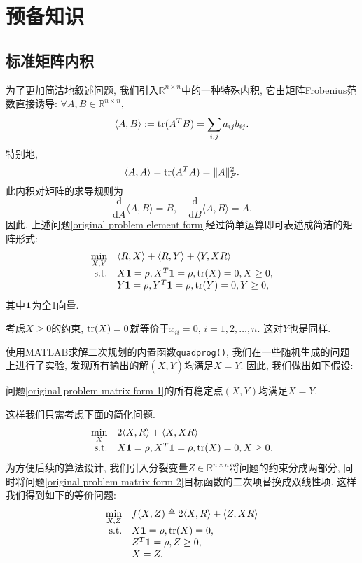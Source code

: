 \section{预备知识}\label{preliminaries}
\subsection{标准矩阵内积}
为了更加简洁地叙述问题, 我们引入$\mathbb{R}^{n\times n}$中的一种特殊内积, 它由矩阵Frobenius范数直接诱导: $\forall A,B\in\mathbb{R}^{n\times n}$,
	$$\langle A,B\rangle:=\mathrm{tr}(A^TB)=\sum\limits_{i,j}a_{ij}b_{ij}.$$
	特别地, 
	$$\langle A,A\rangle=\mathrm{tr}(A^TA)=\Vert A\Vert_F^2.$$
	此内积对矩阵的求导规则为
	$$\frac{\mathrm d}{\mathrm dA}\langle A,B\rangle=B,\quad\frac{\mathrm d}{\mathrm dB}\langle A,B\rangle=A.$$
	因此, 上述问题\eqref{original problem element form}经过简单运算即可表述成简洁的矩阵形式:
	\begin{equation}
	\begin{array}{rl}
	\min\limits_{X,Y} & \langle R,X\rangle+\langle R, Y\rangle+\langle Y,XR\rangle\\
	\mathrm{s.t.} & X\mathbf{1}=\rho,X^T\mathbf{1}=\rho,\mathrm{tr}(X)=0,X\ge0,\\
	& Y\mathbf{1}=\rho,Y^T\mathbf{1}=\rho,\mathrm{tr}(Y)=0,Y\ge0,
	\end{array}
	\label{original problem matrix form 1}
	\end{equation}
	其中$\mathbf{1}$为全1向量. 
	\begin{rem}
		考虑$X\ge0$的约束, $\mathrm{tr}(X)=0$就等价于$x_{ii}=0,\,i=1,2,\ldots,n$. 这对$Y$也是同样. 
	\end{rem}
	使用MATLAB求解二次规划的内置函数\texttt{quadprog()}, 我们在一些随机生成的问题上进行了实验, 发现所有输出的解$(\bar X,\bar Y)$均满足$\bar X=\bar Y$. 因此, 我们做出如下假设:
	\begin{assume}\label{assume}
		问题\eqref{original problem matrix form 1}的所有稳定点$(X,Y)$均满足$X=Y$.
	\end{assume}
	这样我们只需考虑下面的简化问题.
	\begin{equation}
		\begin{array}{rl}
			\min\limits_{X} & 2\langle X,R\rangle+\langle X,XR\rangle\\
			\mathrm{s.t.} & X\mathbf{1}=\rho,X^T\mathbf{1}=\rho,\mathrm{tr}(X)=0,X\ge0.
		\end{array}
		\label{original problem matrix form 2}
	\end{equation}
	为方便后续的算法设计, 我们引入分裂变量$Z\in\mathbb{R}^{n\times n}$将问题的约束分成两部分, 同时将问题\eqref{original problem matrix form 2}目标函数的二次项替换成双线性项. 这样我们得到如下的等价问题:
	\begin{equation}
		\begin{array}{rl}
			\min\limits_{X,Z} & f(X,Z)\triangleq2\langle X,R\rangle+\langle Z,XR\rangle\\
			\mathrm{s.t.} & X\mathbf{1}=\rho,\mathrm{tr}(X)=0,\\
			& Z^T\mathbf{1}=\rho,Z\ge0,\\
			& X=Z.
		\end{array}
		\label{original problem matrix form}
	\end{equation}
	
